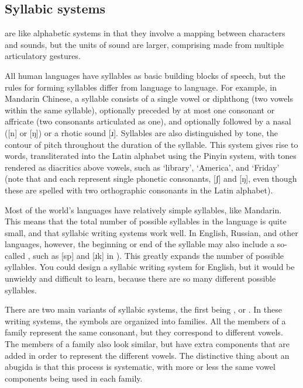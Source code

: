 \subsection{Syllabic systems}

 are like alphabetic
systems in that they involve a mapping between characters and sounds,
but the units of sound are larger, comprising
 made from multiple articulatory gestures.  

All human languages have syllables as basic
building blocks of speech, but the rules for forming syllables differ
from language to language.
For example, in Mandarin Chinese, a syllable consists of a single vowel or diphthong (two vowels within the same syllable), optionally preceded by at most one consonant or affricate (two consonants articulated as one), and optionally followed by a nasal ({[n]} or [ŋ]) or a rhotic sound [ɹ].  Syllables are also distinguished by tone, the contour of pitch throughout the duration of the syllable.  This system gives rise to words, transliterated into the Latin alphabet using the Pinyin system, with tones rendered as diacritics above vowels, such as  `library',  `America', and   `Friday' (note that  and  each represent single phonetic consonants, [ʃ] and [ŋ], even though these are spelled with two orthographic consonants in the Latin alphabet).

Most of the world's
languages have relatively simple syllables, like Mandarin. This means
that the total number of possible syllables in the language is quite
small, and that syllabic writing systems work well. In English, Russian, and other languages, however, the beginning or end of the syllable may also include a
so-called , such as [sp] and [ɹk] in ).  This greatly expands the number of
possible syllables.  You could design a syllabic writing system for
English, but it would be unwieldy and difficult to learn, because
there are so many different possible syllables.

There are two main variants of syllabic systems, the first being
, or . 
In these writing systems, the symbols are organized into families.
All the members of a family represent the same consonant, but
they correspond to different vowels. The members of a family also look
similar, but have extra components that are added in order to represent
the different vowels. The distinctive thing about an abugida is that 
this process is systematic, with more or less the same vowel components
being used in each family.

